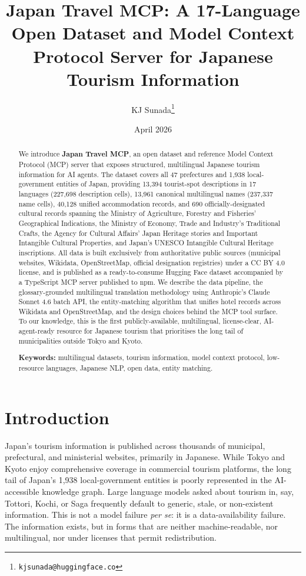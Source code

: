 \documentclass[11pt,a4paper]{article}
\title{\textbf{Japan Travel MCP: A 17-Language Open Dataset and Model Context
Protocol Server for Japanese Tourism Information}}
\author[1]{KJ Sunada\thanks{\texttt{kjsunada@huggingface.co}}}
\affil[1]{KabuK Style Inc., Tokyo, Japan}
\date{April 2026}
\begin{document}
\maketitle

\begin{abstract}
We introduce \textbf{Japan Travel MCP}, an open dataset and reference Model
Context Protocol (MCP) server that exposes structured, multilingual Japanese
tourism information for AI agents. The dataset covers all 47 prefectures and
1{,}938 local-government entities of Japan, providing 13{,}394 tourist-spot
descriptions in 17 languages (227{,}698 description cells), 13{,}961 canonical
multilingual names (237{,}337 name cells), 40{,}128 unified accommodation
records, and 690 officially-designated cultural records spanning the
Ministry of Agriculture, Forestry and Fisheries' Geographical Indications,
the Ministry of Economy, Trade and Industry's Traditional Crafts, the Agency
for Cultural Affairs' Japan Heritage stories and Important Intangible
Cultural Properties, and Japan's UNESCO Intangible Cultural Heritage
inscriptions. All data is built exclusively from authoritative public
sources (municipal websites, Wikidata, OpenStreetMap, official designation
registries) under a CC BY 4.0 license, and is published as a
ready-to-consume Hugging Face dataset accompanied by a TypeScript MCP
server published to npm. We describe the data pipeline, the
glossary-grounded multilingual translation methodology using Anthropic's
Claude Sonnet 4.6 batch API, the entity-matching algorithm that unifies
hotel records across Wikidata and OpenStreetMap, and the design choices
behind the MCP tool surface. To our knowledge, this is the first
publicly-available, multilingual, license-clear, AI-agent-ready resource for
Japanese tourism that prioritises the long tail of municipalities outside
Tokyo and Kyoto.

\medskip\noindent\textbf{Keywords:} multilingual datasets, tourism information,
model context protocol, low-resource languages, Japanese NLP, open data,
entity matching.
\end{abstract}

\section{Introduction}
\label{sec:intro}

Japan's tourism information is published across thousands of municipal,
prefectural, and ministerial websites, primarily in Japanese. While Tokyo
and Kyoto enjoy comprehensive coverage in commercial tourism platforms,
the long tail of Japan's 1{,}938 local-government entities is poorly
represented in the AI-accessible knowledge graph. Large language models
asked about tourism in, say, Tottori, Kochi, or Saga frequently default to
generic, stale, or non-existent information. This is not a model failure
\textit{per se}: it is a data-availability failure. The information exists,
but in forms that are neither machine-readable, nor multilingual, nor
under licenses that permit redistribution.
\end{document}
